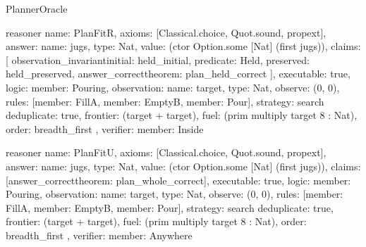 \begin{lexlean}{PlannerOracle}
\begin{semanticmodule}
reasoner{
  name: PlanFitR,
  axioms: [Classical.choice, Quot.sound, propext],
  answer: {name: jugs, type: Nat, value: (ctor Option.some [Nat] (first jugs))},
  claims: [
    observation_invariant{initial: held_initial, predicate: Held, preserved: held_preserved},
    answer_correct{theorem: plan_held_correct}
  ],
  executable: true,
  logic: {member: Pouring},
  observation: {name: target, type: Nat},
  observe: (0, 0),
  rules: [{member: FillA}, {member: EmptyB}, {member: Pour}],
  strategy: search{
    deduplicate: true,
    frontier: (target + target),
    fuel: (prim multiply target 8 : Nat),
    order: breadth_first
  },
  verifier: {member: Inside}
}

reasoner{
  name: PlanFitU,
  axioms: [Classical.choice, Quot.sound, propext],
  answer: {name: jugs, type: Nat, value: (ctor Option.some [Nat] (first jugs))},
  claims: [answer_correct{theorem: plan_whole_correct}],
  executable: true,
  logic: {member: Pouring},
  observation: {name: target, type: Nat},
  observe: (0, 0),
  rules: [{member: FillA}, {member: EmptyB}, {member: Pour}],
  strategy: search{
    deduplicate: true,
    frontier: (target + target),
    fuel: (prim multiply target 8 : Nat),
    order: breadth_first
  },
  verifier: {member: Anywhere}
}
\end{semanticmodule}
\end{lexlean}
